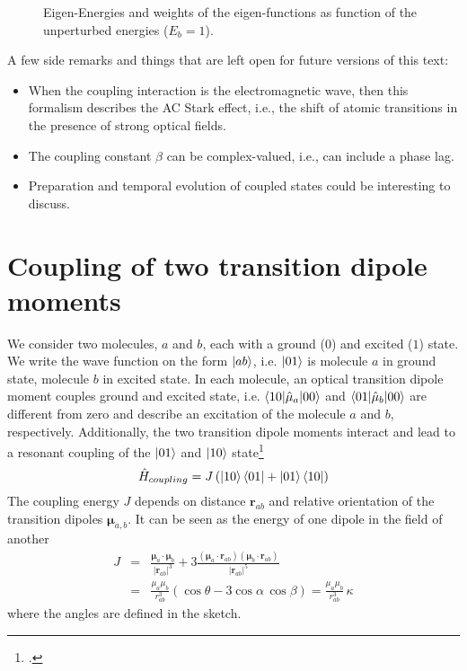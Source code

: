 \begin{figure}
   
\caption{Eigen-Energies and weights of the eigen-functions as function of the unperturbed energies ($E_b = 1$).}
\end{figure}

A few side remarks and things that are left open for future versions of this text: 
\begin{itemize}
    \item When the coupling interaction is the electromagnetic wave, then this formalism describes the AC Stark effect, i.e., the shift of atomic transitions in the presence of strong optical fields.
    \item The coupling constant $\beta$ can be complex-valued, i.e., can include a phase lag.
    \item Preparation and temporal evolution of coupled states could be interesting to discuss.
\end{itemize}




\section{Coupling of two transition dipole moments}


We consider two molecules, $a$ and $b$, each with a ground ($0$) and excited ($1$) state. We write the wave function on the form $\ket{ab}$, i.e. $\ket{01}$ is molecule $a$ in ground state, molecule $b$ in excited state. In each molecule, an optical transition dipole moment couples ground and excited state, i.e. $\braket{10| \hat{\mu}_a | 00}$ and $\braket{01| \hat{\mu}_b | 00}$ are different from zero and describe an excitation of the molecule  $a$ and $b$, respectively. Additionally, the two transition dipole moments interact and lead to a resonant coupling of the 
$\ket{01}$ and $\ket{10}$ state\footcite{knoester-book}
\begin{equation}
\hat{H}_{coupling} = J \left(  \ket{10}\bra{01} + \ket{01}\bra{10}  \right)
\end{equation}
The coupling energy $J$ depends on distance $\boldsymbol{r}_{ab}$ and relative orientation of the transition dipoles $\boldsymbol{\mu}_{a,b}$. It can be seen as the energy of one dipole in the field of another
\begin{eqnarray}
 J & = & \frac{\boldsymbol{\mu}_a \cdot  \boldsymbol{\mu}_b }{|\boldsymbol{r}_{ab}|^3} 
  + 3 \frac{ (\boldsymbol{\mu}_a \cdot  \boldsymbol{r}_{ab})  (\boldsymbol{\mu}_b \cdot  \boldsymbol{r}_{ab})
  }{ |\boldsymbol{r}_{ab}|^5 } \\
   & = & \frac{\mu_a \mu_b }{r_{ab}^3} \left( \cos \theta - 3 \cos \alpha \, \cos \beta \right)  = \frac{\mu_a \mu_b }{r_{ab}^3} \, \kappa
\end{eqnarray}
where the angles are defined in the sketch.

